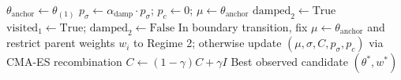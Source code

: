 \documentclass[journal]{IEEEtran}
\begin{document}
\begin{algorithm}[!t]
\begin{algorithmic}[1]
        \STATE $\theta_{\text{anchor}} \leftarrow \theta_{(1)}$ 
            \STATE $p_\sigma \leftarrow \alpha_{\text{damp}} \cdot p_\sigma$; \quad $p_c \leftarrow 0$; \quad $\mu \leftarrow \theta_{\text{anchor}}$ 
            \STATE $\text{damped}_2 \leftarrow \text{True}$
        \ENDIF
        \STATE $\text{visited}_1 \leftarrow \text{True}$; \quad $\text{damped}_2 \leftarrow \text{False}$ 
    \ENDIF
    \STATE In boundary transition, fix $\mu \leftarrow \theta_{\text{anchor}}$ and restrict parent weights $w_i$ to Regime 2; otherwise update $(\mu, \sigma, C, p_\sigma, p_c)$ via CMA-ES recombination
     \STATE $C \leftarrow (1-\gamma)C + \gamma I$  \ENDIF
\ENDWHILE
\RETURN Best observed candidate $(\theta^*, w^*)$
\end{algorithmic}
\end{algorithm}
\end{document}
